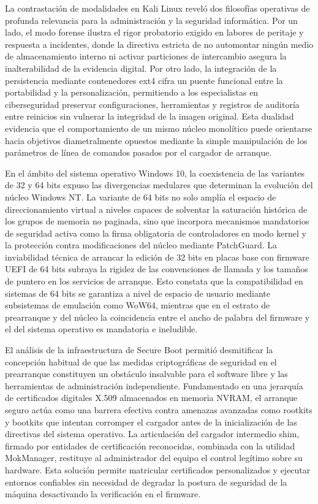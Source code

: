 \documentclass[12pt]{article}
\begin{document}
La contrastación de modalidades en Kali Linux reveló dos filosofías operativas de profunda relevancia para la administración y la seguridad informática. Por un lado, el modo forense ilustra el rigor probatorio exigido en labores de peritaje y respuesta a incidentes, donde la directiva estricta de no automontar ningún medio de almacenamiento interno ni activar particiones de intercambio asegura la inalterabilidad de la evidencia digital. Por otro lado, la integración de la persistencia mediante contenedores ext4 cifra un puente funcional entre la portabilidad y la personalización, permitiendo a los especialistas en ciberseguridad preservar configuraciones, herramientas y registros de auditoría entre reinicios sin vulnerar la integridad de la imagen original. Esta dualidad evidencia que el comportamiento de un mismo núcleo monolítico puede orientarse hacia objetivos diametralmente opuestos mediante la simple manipulación de los parámetros de línea de comandos pasados por el cargador de arranque.

En el ámbito del sistema operativo Windows 10, la coexistencia de las variantes de 32 y 64 bits expuso las divergencias medulares que determinan la evolución del núcleo Windows NT. La variante de 64 bits no solo amplía el espacio de direccionamiento virtual a niveles capaces de solventar la saturación histórica de los grupos de memoria no paginada, sino que incorpora mecanismos mandatorios de seguridad activa como la firma obligatoria de controladores en modo kernel y la protección contra modificaciones del núcleo mediante PatchGuard. La inviabilidad técnica de arrancar la edición de 32 bits en placas base con firmware UEFI de 64 bits subraya la rigidez de las convenciones de llamada y los tamaños de puntero en los servicios de arranque. Esto constata que la compatibilidad en sistemas de 64 bits se garantiza a nivel de espacio de usuario mediante subsistemas de emulación como WoW64, mientras que en el estrato de prearranque y del núcleo la coincidencia entre el ancho de palabra del firmware y el del sistema operativo es mandatoria e ineludible.

El análisis de la infraestructura de Secure Boot permitió desmitificar la concepción habitual de que las medidas criptográficas de seguridad en el prearranque constituyen un obstáculo insalvable para el software libre y las herramientas de administración independiente. Fundamentado en una jerarquía de certificados digitales X.509 almacenados en memoria NVRAM, el arranque seguro actúa como una barrera efectiva contra amenazas avanzadas como rootkits y bootkits que intentan corromper el cargador antes de la inicialización de las directivas del sistema operativo. La articulación del cargador intermedio shim, firmado por entidades de certificación reconocidas, combinada con la utilidad MokManager, restituye al administrador del equipo el control legítimo sobre su hardware. Esta solución permite matricular certificados personalizados y ejecutar entornos confiables sin necesidad de degradar la postura de seguridad de la máquina desactivando la verificación en el firmware.
\end{document}
